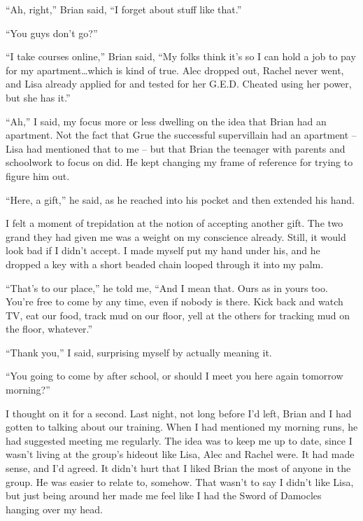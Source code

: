 ``Ah, right,'' Brian said, ``I forget about stuff like that.''



``You guys don't go?''



``I take courses online,'' Brian said, ``My folks think it's so I can hold a job to pay for my apartment\ldots which is kind of true.  Alec dropped out, Rachel never went, and Lisa already applied for and tested for her G.E.D.  Cheated using her power, but she has it.''



``Ah,'' I said, my focus more or less dwelling on the idea that Brian had an apartment.  Not the fact that Grue the successful supervillain had an apartment – Lisa had mentioned that to me – but that Brian the teenager with parents and schoolwork to focus on did.  He kept changing my frame of reference for trying to figure him out.



``Here, a gift,'' he said, as he reached into his pocket and then extended his hand.



I felt a moment of trepidation at the notion of accepting another gift.  The two grand they had given me was a weight on my conscience already.  Still, it would look bad if I didn't accept.  I made myself put my hand under his, and he dropped a key with a short beaded chain looped through it into my palm.



``That's to our place,'' he told me, ``And I mean that.  Ours as in yours too.  You're free to come by any time, even if nobody is there.  Kick back and watch TV, eat our food, track mud on our floor, yell at the others for tracking mud on the floor, whatever.''



``Thank you,'' I said, surprising myself by actually meaning it.



``You going to come by after school, or should I meet you here again tomorrow morning?''



I thought on it for a second.  Last night, not long before I'd left, Brian and I had gotten to talking about our training.  When I had mentioned my morning runs, he had suggested meeting me regularly.  The idea was to keep me up to date, since I wasn't living at the group's hideout like Lisa, Alec and Rachel were.  It had made sense, and I'd agreed.  It didn't hurt that I liked Brian the most of anyone in the group.  He was easier to relate to, somehow.  That wasn't to say I didn't like Lisa, but just being around her made me feel like I had the Sword of Damocles hanging over my head.



